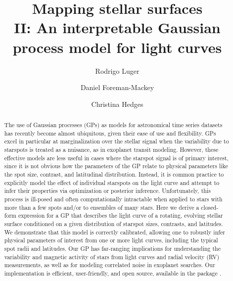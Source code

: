 \documentclass[modern,linenumbers]{aastex62}
\begin{document}
\title{%
    \vspace{-3em}
    \textbf{
        Mapping stellar surfaces\\
        II: An interpretable Gaussian process model for light curves
    }
}

\author[0000-0002-0296-3826]{Rodrigo Luger}
%
\author[0000-0002-9328-5652]{Daniel Foreman-Mackey}
%
\author[0000-0002-3385-8391]{Christina Hedges}
%



\begin{abstract}
    The use of Gaussian processes (GPs) as models for astronomical time series datasets has recently
    become almost ubiquitous, given their ease of use and flexibility. GPs excel in particular at
    marginalization over the stellar signal when the variability due to starspots is treated as a
    nuisance, as in exoplanet transit modeling. However, these effective models are less useful in
    cases where the starspot signal is of primary interest, since it is not obvious how the parameters
    of the GP relate to physical parameters like the spot size, contrast, and latitudinal distribution.
    Instead, it is common practice to explicitly model the effect of individual starspots on the
    light curve and attempt to infer their properties via optimization or posterior inference.
    Unfortunately, this process is ill-posed and often computationally intractable when applied
    to stars with more than a few spots and/or to ensembles of many stars. Here we derive a
    closed-form expression for a GP that describes the light curve of a rotating, evolving stellar
    surface conditioned on a given distribution of starspot sizes, contrasts, and latitudes. We
    demonstrate that this model is correctly calibrated, allowing one to robustly infer physical
    parameters of interest from one or more light curves, including the typical spot radii and
    latitudes. Our GP has far-ranging implications for understanding the variability and magnetic
    activity of stars from light curves and radial velocity (RV) measurements, as well as for
    modeling correlated noise in exoplanet searches. Our implementation is efficient, user-friendly,
    and open source, available in the package \starryprocess.
    \href{https://github.com/rodluger/starry_process}{\color{linkcolor}\faGithub}
\end{abstract}
\end{document}
